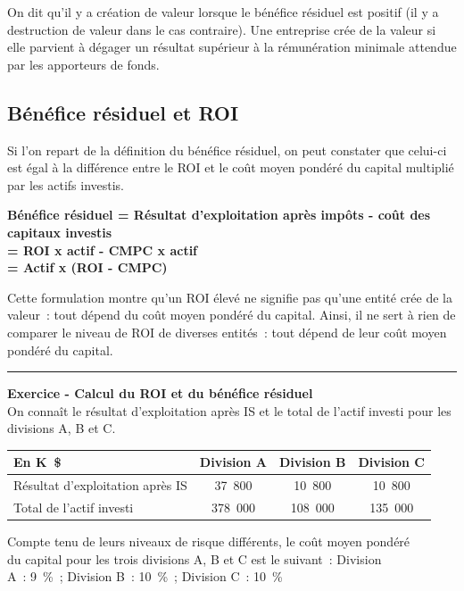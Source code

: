 \documentclass{kaobook}
\begin{document}
On dit qu'il y a création de valeur lorsque le bénéfice résiduel est positif (il y a destruction de valeur dans le cas contraire). Une entreprise crée de la valeur si elle parvient à dégager un résultat supérieur à la rémunération minimale attendue par les apporteurs de fonds.\\

\subsection{Bénéfice résiduel et ROI}
\label{sec:org48b245c}
Si l'on repart de la définition du bénéfice résiduel, on peut constater que celui-ci est égal à la différence entre le ROI et le coût moyen pondéré du capital multiplié par les actifs investis.\\
\begin{center}
\textbf{Bénéfice résiduel = Résultat d'exploitation après impôts - coût des\\
capitaux investis}\\
\textbf{= ROI x actif - CMPC x actif}\\
\textbf{= Actif x (ROI - CMPC)}\\
\end{center}
Cette formulation montre qu'un ROI élevé ne signifie pas qu'une entité crée de la valeur : tout dépend du coût moyen pondéré du capital. Ainsi, il ne sert à rien de comparer le niveau de ROI de diverses entités : tout dépend de leur coût moyen pondéré du capital.\\

\noindent\rule{\textwidth}{0.5pt}
\textbf{Exercice -  Calcul du ROI et du bénéfice résiduel}\\
On connaît le résultat d'exploitation après IS et le total de l'actif investi pour les divisions A, B et C.\\
\begin{center}
\begin{tabular}{l c c c}
En K \$ & Division A & Division B & Division C\\
\hline
Résultat d'exploitation après IS & 37 800 & 10 800 & 10 800\\
Total de l'actif investi & 378 000 & 108 000 & 135 000\\
\end{tabular}
\end{center}
Compte tenu de leurs niveaux de risque différents, le coût moyen pondéré\\
du capital pour les trois divisions A, B et C est le suivant : Division\\
A : 9 \% ; Division B : 10 \% ; Division C : 10 \%\\
\end{document}
